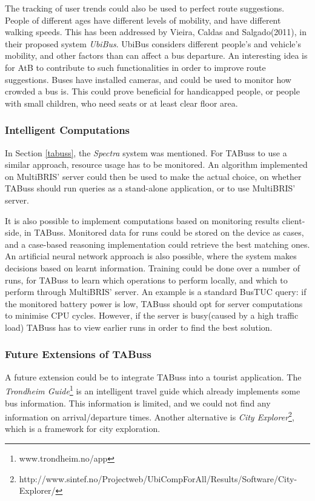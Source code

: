 The tracking of user trends could also be used to perfect route suggestions. People of different ages have different levels of mobility, and have different walking speeds. This has been addressed by Vieira, Caldas and Salgado(2011), in their proposed system \emph{UbiBus}\cite{vieira}. UbiBus considers different people's and vehicle's mobility, and other factors than can affect a bus departure. An interesting idea is for AtB to contribute to such functionalities in order to improve route suggestions. Buses have installed cameras, and could be used to monitor how crowded a bus is. This could prove beneficial for handicapped people, or people with small children, who need seats or at least clear floor area.

\subsubsection{Intelligent Computations}
In Section \ref{tabuss}, the \emph{Spectra} system was mentioned. For TABuss to use a similar approach, resource usage has to be monitored. An algorithm implemented on MultiBRIS' server could then be used to make the actual choice, on whether TABuss should run queries as a stand-alone application, or to use MultiBRIS' server. 

It is also possible to implement computations based on monitoring results client-side, in TABuss. Monitored data for runs could be stored on the device as cases, and a case-based reasoning implementation could retrieve the best matching ones. An artificial neural network approach is also possible, where the system makes decisions based on learnt information. Training could be done over a number of runs, for TABuss to learn which operations to perform locally, and which to perform through MultiBRIS' server. An example is a standard BusTUC query: if the monitored battery power is low, TABuss should opt for server computations to minimise CPU cycles. However, if the server is busy(caused by a high traffic load) TABuss has to view earlier runs in order to find the best solution.

\subsubsection{Future Extensions of TABuss}
A future extension could be to integrate TABuss into a tourist application. The \emph{Trondheim Guide}\footnote{www.trondheim.no/app} is an intelligent travel guide which already implements some bus information. This information is limited, and we could not find any information on arrival/departure times. Another alternative is \emph{City Explorer}\footnote{http://www.sintef.no/Projectweb/UbiCompForAll/Results/Software/City-Explorer/}, which is a framework for city exploration.


